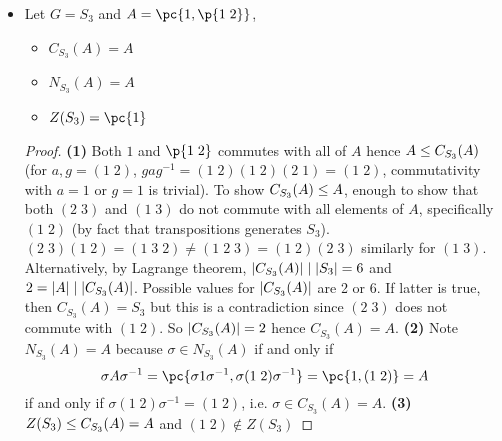 \documentclass[11pt]{article}
\begin{document}
\begin{definition*}
\begin{itemize}
\begin{itemize}
\begin{proof}
            \end{proof}
            \item Let $G=S_3$ and $A=\pc{1, \p{1\;2}}$,
            \begin{itemize}
                \item $C_{S_3}(A) = A$
                \item $N_{S_3}(A) = A$
                \item $Z(S_3) = \pc{1}$
            \end{itemize}
            \begin{proof}
                \textbf{(1)} Both $1$ and $\p{1\;2}$ commutes with all of $A$ hence $A \leq C_{S_3}(A)$ (for $a,g=(1\;2)$, $gag^{-1} = (1\;2)(1\;2)(2\;1) = (1\;2)$, commutativity with $a=1$ or $g=1$ is trivial). To show $C_{S_3}(A) \leq A$, enough to show that both $(2\;3)$ and $(1\;3)$ do not commute with all elements of $A$, specifically $(1\;2)$ (by fact that transpositions generates $S_3$). $(2\;3)(1\;2) = (1\;3\;2) \neq (1\;2\;3) = (1\;2)(2\;3)$ similarly for $(1\;3)$. Alternatively, by Lagrange theorem, $\left|C_{S_3}(A)\right| \mid \left|S_3\right|=6$ and $2 = \left|A\right| \mid \left|C_{S_3}(A)\right|$. Possible values for $\left|C_{S_3}(A)\right|$ are 2 or 6. If latter is true, then $C_{S_3}(A) = S_3$ but this is a contradiction since $(2\;3)$ does not commute with $(1\;2)$. So $\left|C_{S_3}(A)\right| = 2$ hence $C_{S_3}(A)=A$. \textbf{(2)} Note $N_{S_3}(A)=A$ because $\sigma \in N_{S_3}(A)$ if and only if 
                \[
                    \sigma A\sigma^{-1}
                    = \pc{\sigma 1 \sigma^{-1}, \sigma (1\;2) \sigma^{-1}}
                    = \pc{1, (1\;2)}
                    = A
                \]
                if and only if $\sigma (1\;2) \sigma^{-1} = (1\;2)$, i.e. $\sigma\in C_{S_3}(A) =A$. \textbf{(3)} $Z(S_3) \leq C_{S_3}(A)=A$ and $(1\;2)\not\in Z(S_3)$
            \end{proof}
        \end{itemize}
    \end{itemize}
\end{definition*}
\end{document}
